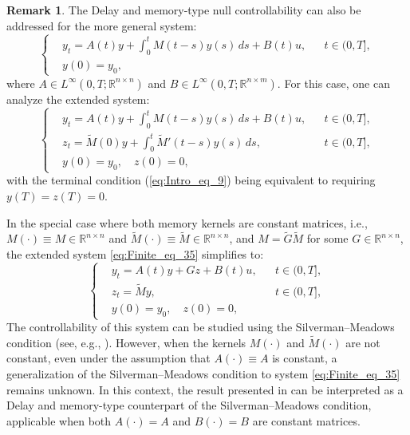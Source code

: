 \documentclass[12pt]{article}
\theoremstyle{plain}
\theoremstyle{definition}
\newtheorem{remark}{Remark}[section]
\begin{document}
\begin{remark}

The Delay and memory-type null controllability can also be addressed for the more general system:
\begin{equation}
\label{eq:Finite_eq_34}
\left\{
\begin{aligned}
& y_t = A(t)y + \int_0^t M(t-s)y(s)\,ds + B(t)u, && t \in (0,T], \\
& y(0) = y_0,
\end{aligned}
\right.
\end{equation}
where \( A \in L^\infty(0,T;\mathbb{R}^{n \times n}) \) and \( B \in L^\infty(0,T;\mathbb{R}^{n \times m}) \). For this case, one can analyze the extended system:
\begin{equation}
\label{eq:Finite_eq_35}
\left\{
\begin{aligned}
& y_t = A(t)y + \int_0^t M(t-s)y(s)\,ds + B(t)u, && t \in (0,T], \\
& z_t = \widetilde{M}(0)y + \int_0^t \widetilde{M}'(t-s)y(s)\,ds, && t \in (0,T], \\
& y(0) = y_0, \quad z(0) = 0,
\end{aligned}
\right.
\end{equation}
with the terminal condition (\ref{eq:Intro_eq_9}) being equivalent to requiring \( y(T) = z(T) = 0 \).

\vspace{1em}
In the special case where both memory kernels are constant matrices, i.e., \( M(\cdot) \equiv M \in \mathbb{R}^{n \times n} \) and \( \widetilde{M}(\cdot) \equiv \widetilde{M} \in \mathbb{R}^{n \times n} \), and \( M = \widetilde{G}\widetilde{M} \) for some \( G \in \mathbb{R}^{n \times n} \), the extended system \eqref{eq:Finite_eq_35} simplifies to:
\begin{equation}
\label{eq:Finite_eq_36}
\left\{
\begin{aligned}
& y_t = A(t)y + Gz + B(t)u, && t \in (0,T], \\
& z_t = \widetilde{M}y, && t \in (0,T], \\
& y(0) = y_0, \quad z(0) = 0,
\end{aligned}
\right.
\end{equation}
The controllability of this system can be studied using the Silverman–Meadows condition (see, e.g., \cite[Theorem 1.18, p. 11]{coron2007control}). However, when the kernels \( M(\cdot) \) and \( \widetilde{M}(\cdot) \) are not constant, even under the assumption that \( A(\cdot) \equiv A \) is constant, a generalization of the Silverman–Meadows condition to system \eqref{eq:Finite_eq_35} remains unknown. In this context, the result presented in \cite[Theorem 3.3]{chaves2017controllability} can be interpreted as a Delay and memory-type counterpart of the Silverman–Meadows condition, applicable when both \( A(\cdot) = A \) and \( B(\cdot) = B \) are constant matrices.

\end{remark}
\end{document}
